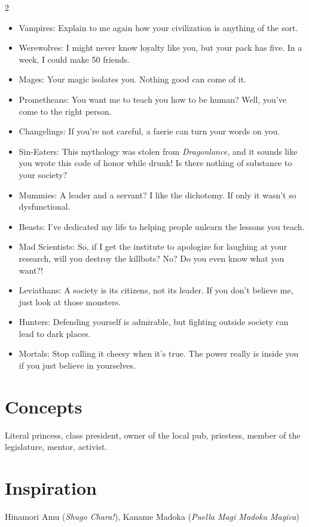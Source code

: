 \begin{multicols}{2}
\begin{itemize}
\item Vampires: Explain to me again how your civilization is anything of the sort. 
\item Werewolves: I might never know loyalty like you, but your pack has five. In a week, I could make 50 friends. 
\item Mages: Your magic isolates you. Nothing good can come of it. 
\item Prometheans: You want me to teach you how to be human? Well, you've come to the right person. 
\item Changelings: If you're not careful, a faerie can turn your words on you.
\item Sin-Eaters: This mythology was stolen from \textit{Dragonlance,} and it sounds like you wrote this code of honor while drunk! Is there nothing of substance to your society?
\item Mummies: A leader and a servant? I like the dichotomy. If only it wasn't so dysfunctional. 
\item Beasts: I've dedicated my life to helping people unlearn the lessons you teach. 

\item Mad Scientists: So, if I get the institute to apologize for laughing at your research, will you destroy the killbots? No? Do you even know what you want?!
\item Leviathans: A society is its citizens, not its leader. If you don't believe me, just look at those monsters.

\item Hunters: Defending yourself is admirable, but fighting outside society can lead to dark places.
\item Mortals: Stop calling it cheesy when it's true. The power really is inside you if you just believe in yourselves. 
\end{itemize}

\section*{Concepts}

Literal princess, class president, owner of the local pub, priestess, member of the legislature, mentor, activist. 

\section*{Inspiration}
Hinamori Amu (\textit{Shugo Chara!}), Kaname Madoka (\textit{Puella Magi Madoka Magica})

\end{multicols}\newpage{}

